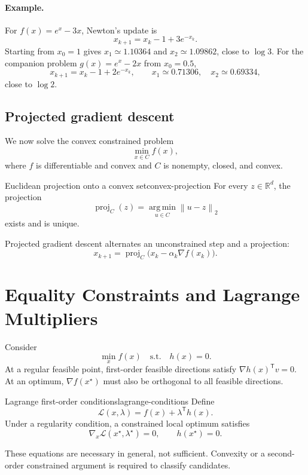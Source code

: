 \documentclass[11pt]{article}
\newcommand{\R}{\mathbb{R}}
\newcommand{\trans}{^{\mathsf T}}
\newcommand{\grad}{\nabla}
\newcommand{\norm}[1]{\left\lVert#1\right\rVert}
\newcommand{\argmin}{\operatorname*{arg\,min}}
\newcommand{\proj}{\operatorname{proj}}
\theoremstyle{definition}
\theoremstyle{remark}
\begin{document}
\paragraph{Example.}
For $f(x)=e^x-3x$, Newton's update is
\[
x_{k+1}=x_k-1+3e^{-x_k}.
\]
Starting from $x_0=1$ gives $x_1\simeq1.10364$ and
$x_2\simeq1.09862$, close to $\log3$. For the companion problem
$g(x)=e^x-2x$ from $x_0=0.5$,
\[
x_{k+1}=x_k-1+2e^{-x_k},
\qquad
\boxed{x_1\simeq0.71306,\quad x_2\simeq0.69334,}
\]
close to $\log2$.

\subsection{Projected gradient descent}

We now solve the convex constrained problem
\[
  \min_{x\in C}f(x),
\]
where $f$ is differentiable and convex and $C$ is nonempty, closed, and convex.

\begin{keyproposition}{Euclidean projection onto a convex set}{convex-projection}
For every $z\in\R^d$, the projection
\[
  \boxed{\proj_C(z)=\argmin_{u\in C}\norm{u-z}_2}
\]
exists and is unique.
\end{keyproposition}

Projected gradient descent alternates an unconstrained step and a projection:
\[
  \boxed{x_{k+1}=\proj_C\bigl(x_k-\alpha_k\grad f(x_k)\bigr).}
\]

\section{Equality Constraints and Lagrange Multipliers}

Consider
\[
  \min_x f(x)\quad\text{s.t.}\quad h(x)=0.
\]
At a regular feasible point, first-order feasible directions satisfy
$\grad h(x)\trans v=0$. At an optimum, $\grad f(x^\star)$ must also be
orthogonal to all feasible directions.

\begin{keyproposition}{Lagrange first-order conditions}{lagrange-conditions}
Define
\[
  \mathcal L(x,\lambda)=f(x)+\lambda\trans h(x).
\]
Under a regularity condition, a constrained local optimum satisfies
\[
  \boxed{
  \grad_x\mathcal L(x^\star,\lambda^\star)=0,
  \qquad h(x^\star)=0.}
\]
\end{keyproposition}

These equations are necessary in general, not sufficient. Convexity or a
second-order constrained argument is required to classify candidates.
\end{document}
